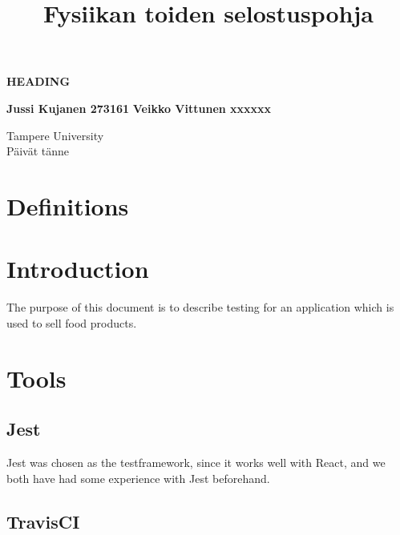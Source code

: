 \documentclass[a4paper, 12pt]{article}
\title{Fysiikan toiden selostuspohja}
\begin{document}
\begin{titlepage}
    \begin{center}
        \vspace*{1cm}
 
        \textbf{HEADING}
 
        \vspace{0.5cm}
       
             
        \vspace{1.5cm}
 
        \textbf{Jussi Kujanen 273161}
        \textbf{Veikko Vittunen xxxxxx}
 
        \vfill
             
    
             
        \vspace{0.8cm}
      
   
             
       
        Tampere University\\
       Päivät tänne
             
    \end{center}
 \end{titlepage} 



\newpage
\thispagestyle{empty}
\tableofcontents

\newpage
\clearpage
{} 

\section{Definitions}

\section{Introduction}
The purpose of this document is to describe testing for an application which is used to sell food products. 
\section{Tools}

    \subsection{Jest}
    Jest was chosen as the testframework, since it works well with React, and we both have had some experience with Jest beforehand.
    \subsection{TravisCI}
\end{document}
